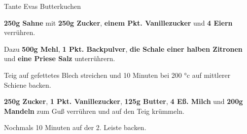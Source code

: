 \begin{recipe}[]{Tante Evas Butterkuchen} %
	\personcount{} %


\step
\textbf{250g Sahne} mit \textbf{250g Zucker}, \textbf{einem Pkt. Vanillezucker} und \textbf{4 Eiern} verrühren.

\step
Dazu \textbf{500g Mehl}, \textbf{1 Pkt. Backpulver}, \textbf{die Schale einer halben Zitronen} und \textbf{eine Priese Salz} unterrührern.

\step
Teig auf gefettetes Blech streichen und 10 Minuten bei 200 °c auf mittlerer Schiene backen.

\step
\textbf{250g Zucker}, \textbf{1 Pkt. Vanillezucker}, \textbf{125g Butter}, \textbf{4 Eß. Milch} und \textbf{200g Mandeln} zum Guß verrühren und auf den Teig krümmeln.

\step
Nochmals 10 Minuten auf der 2. Leiste backen.

\end{recipe}